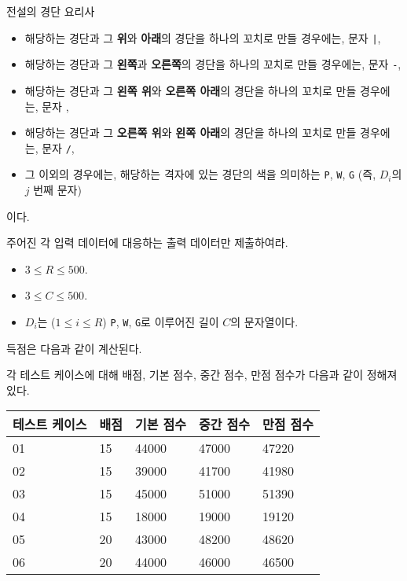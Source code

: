 \begin{problem}{전설의 경단 요리사}
\begin{itemize}
	\item 해당하는 경단과 그 \textbf{위}와 \textbf{아래}의 경단을 하나의 꼬치로 만들 경우에는, 문자 \texttt{|},
	
	\item 해당하는 경단과 그 \textbf{왼쪽}과 \textbf{오른쪽}의 경단을 하나의 꼬치로 만들 경우에는, 문자 \texttt{-},
	
	\item 해당하는 경단과 그 \textbf{왼쪽 위}와 \textbf{오른쪽 아래}의 경단을 하나의 꼬치로 만들 경우에는, 문자 \texttt{},
	
	\item 해당하는 경단과 그 \textbf{오른쪽 위}와 \textbf{왼쪽 아래}의 경단을 하나의 꼬치로 만들 경우에는, 문자 \texttt{/},
	
	\item 그 이외의 경우에는, 해당하는 격자에 있는 경단의 색을 의미하는 \texttt{P}, \texttt{W}, \texttt{G} (즉, $D_i$의 $j$ 번째 문자)
	
\end{itemize}

이다.

주어진 각 입력 데이터에 대응하는 출력 데이터만 제출하여라.



\Constraints

\begin{itemize}
	\item $3 \le R \le 500$.
	\item $3 \le C \le 500$.
	\item $D_i$는 ($1 \le i \le R$) \texttt{P}, \texttt{W}, \texttt{G}로 이루어진 길이 $C$의 문자열이다.
\end{itemize}

\Scoring

득점은 다음과 같이 계산된다.

각 테스트 케이스에 대해 배점, 기본 점수, 중간 점수, 만점 점수가 다음과 같이 정해져 있다.

\begin{tabular}{|l|l|l|l|l|}
	\hline
	테스트 케이스 & 배점 & 기본 점수 & 중간 점수 & 만점 점수 \\ \hline
	01      & 15 & 44000 & 47000 & 47220 \\
	02      & 15 & 39000 & 41700 & 41980 \\
	03      & 15 & 45000 & 51000 & 51390 \\
	04      & 15 & 18000 & 19000 & 19120 \\
	05      & 20 & 43000 & 48200 & 48620 \\
	06      & 20 & 44000 & 46000 & 46500 \\ \hline
\end{tabular}


\end{problem}
